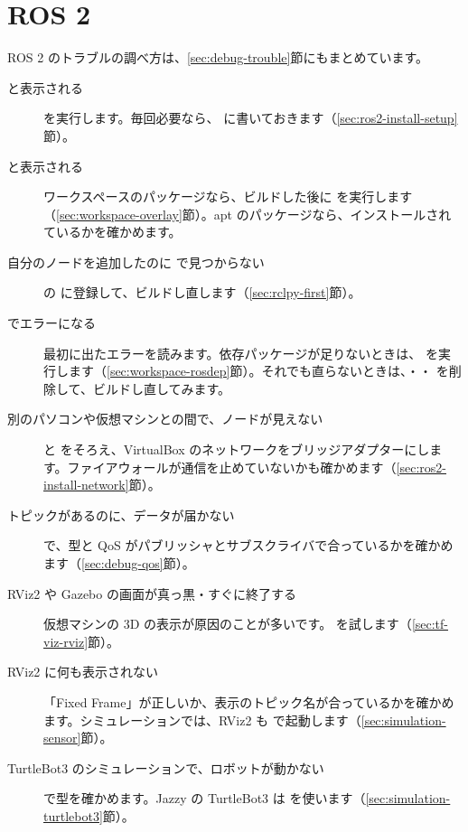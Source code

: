 \section{ROS 2}
\label{sec:troubleshooting-ros2}

ROS 2 のトラブルの調べ方は、\ref{sec:debug-trouble}節にもまとめています。

\begin{description}
  \item[ と表示される]  を実行します。毎回必要なら、 に書いておきます（\ref{sec:ros2-install-setup}節）。
  \item[ と表示される] ワークスペースのパッケージなら、ビルドした後に  を実行します（\ref{sec:workspace-overlay}節）。apt のパッケージなら、インストールされているかを確かめます。
  \item[自分のノードを追加したのに  で見つからない]  の  に登録して、ビルドし直します（\ref{sec:rclpy-first}節）。
  \item[ でエラーになる] 最初に出たエラーを読みます。依存パッケージが足りないときは、 を実行します（\ref{sec:workspace-rosdep}節）。それでも直らないときは、・・ を削除して、ビルドし直してみます。
  \item[別のパソコンや仮想マシンとの間で、ノードが見えない]  と \allowbreak{} をそろえ、VirtualBox のネットワークをブリッジアダプターにします。ファイアウォールが通信を止めていないかも確かめます（\ref{sec:ros2-install-network}節）。
  \item[トピックがあるのに、データが届かない]  で、型と QoS がパブリッシャとサブスクライバで合っているかを確かめます（\ref{sec:debug-qos}節）。
  \item[RViz2 や Gazebo の画面が真っ黒・すぐに終了する] 仮想マシンの 3D の表示が原因のことが多いです。 を試します（\ref{sec:tf-viz-rviz}節）。
  \item[RViz2 に何も表示されない] 「Fixed Frame」が正しいか、表示のトピック名が合っているかを確かめます。シミュレーションでは、RViz2 も  で起動します（\ref{sec:simulation-sensor}節）。
  \item[TurtleBot3 のシミュレーションで、ロボットが動かない]  で型を確かめます。Jazzy の TurtleBot3 は  を使います（\ref{sec:simulation-turtlebot3}節）。
\end{description}
